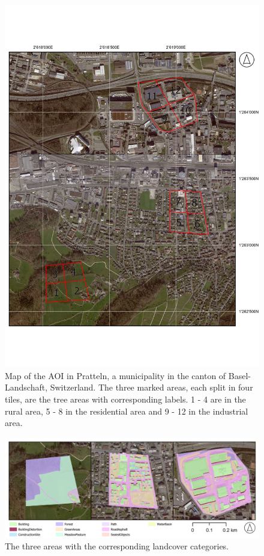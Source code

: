 \begin{figure}[H]
    \centering
    \captionsetup{width=0.8\linewidth}
    \includegraphics[scale=0.6]{figures/map_aoi.pdf}
    \caption{Map of the AOI in Pratteln, a  municipality in the canton of Basel-Landschaft, Switzerland. 
    The three marked areas, each split in four tiles, are the tree areas with corresponding labels. 1 - 4 are in the rural area,
    5 - 8 in the residential area and 9 - 12 in the industrial area.}
    \label{fig:aoi_labeled}
\end{figure}

\begin{figure}[H]
    \centering
    \captionsetup{width=0.8\linewidth}
    \includegraphics[width=\linewidth]{figures/map_aoi_category.pdf}
    \caption{The three areas with the corresponding landcover categories.}
    \label{fig:category_areas}
\end{figure}

